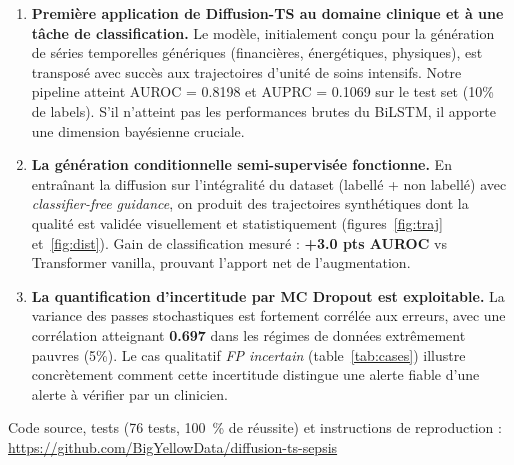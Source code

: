 \documentclass[11pt,a4paper]{article}
\begin{document}
\begin{enumerate}
    \item \textbf{Première application de Diffusion-TS au domaine clinique et à
    une tâche de classification.} Le modèle, initialement conçu pour la génération
    de séries temporelles génériques (financières, énergétiques, physiques), est
    transposé avec succès aux trajectoires d'unité de soins intensifs. Notre pipeline
    atteint AUROC = 0.8198 et AUPRC = 0.1069 sur le test set (10\% de labels). S'il
    n'atteint pas les performances brutes du BiLSTM, il apporte une dimension
    bayésienne cruciale.

    \item \textbf{La génération conditionnelle semi-supervisée fonctionne.} En
    entraînant la diffusion sur l'intégralité du dataset (labellé + non labellé)
    avec \emph{classifier-free guidance}, on produit des trajectoires synthétiques
    dont la qualité est validée visuellement et statistiquement
    (figures~\ref{fig:traj} et~\ref{fig:dist}). Gain de classification mesuré :
    \textbf{+3.0 pts AUROC} vs Transformer vanilla, prouvant l'apport net de l'augmentation.

    \item \textbf{La quantification d'incertitude par MC Dropout est exploitable.}
    La variance des passes stochastiques est fortement corrélée aux erreurs, avec
    une corrélation atteignant \textbf{0.697} dans les régimes de données extrêmement
    pauvres (5\%). Le cas qualitatif \emph{FP incertain} (table~\ref{tab:cases})
    illustre concrètement comment cette incertitude distingue une alerte fiable
    d'une alerte à vérifier par un clinicien.
\end{enumerate}

Code source, tests (76 tests, 100~\% de réussite) et instructions de reproduction :
\url{https://github.com/BigYellowData/diffusion-ts-sepsis}


\newpage
\end{document}
